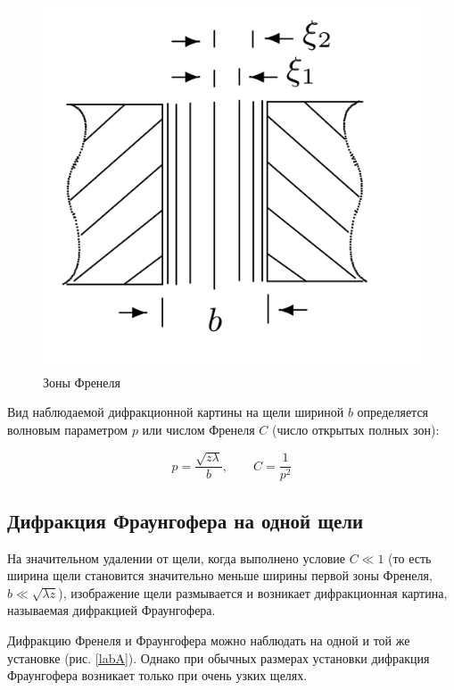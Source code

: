 \documentclass[a4paper,12pt]{article} %
\begin{document}
\begin{figure}[H]
	\begin{center}
		\includegraphics[scale=0.15]{zone.jpeg}
	\end{center}
	\caption{Зоны Френеля}
	\label{zone}
\end{figure}

Вид наблюдаемой дифракционной картины
на щели шириной $ b $ определяется волновым параметром $ p $ или числом Френеля $ C $ (число открытых полных зон):


\begin{equation}\label{}
p = \dfrac{\sqrt{z \lambda}}{b}, \qquad C = \dfrac{1}{p^2}
\end{equation}




\subsection{Дифракция Фраунгофера на одной щели}

На значительном удалении от щели, когда выполнено условие $ C \ll 1 $
(то есть ширина щели становится значительно меньше ширины первой
зоны Френеля, $ b \ll \sqrt{\lambda z} $), изображение щели размывается и возникает
дифракционная картина, называемая дифракцией Фраунгофера.

Дифракцию Френеля и Фраунгофера можно наблюдать на одной
и той же установке (рис. \ref{labA}). Однако при обычных размерах установки дифракция Фраунгофера возникает только при очень узких щелях.
\end{document}
